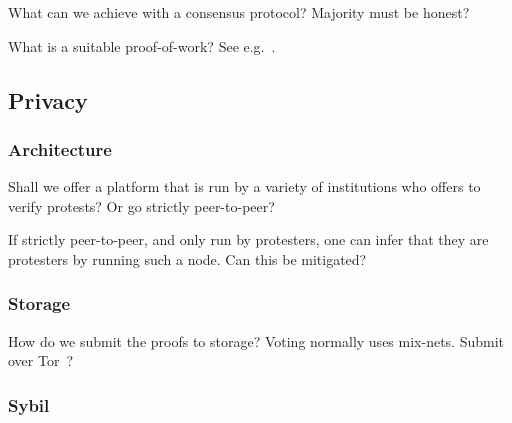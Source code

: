 \begin{frame}
  \begin{question}
    What can we achieve with a consensus protocol?
    Majority must be honest?
  \end{question}
  \begin{question}
    What is a suitable proof-of-work?
    See e.g.~\cite{FairProofOfWork}.
  \end{question}
\end{frame}

\subsection{Privacy}

\subsubsection{Architecture}

\begin{frame}
  \begin{question}
    Shall we offer a platform that is run by a variety of institutions who 
    offers to verify protests?
    Or go strictly peer-to-peer?
  \end{question}
  \begin{question}
    If strictly peer-to-peer, and only run by protesters, one can infer that 
    they are protesters by running such a node.
    Can this be mitigated?
  \end{question}
\end{frame}

\subsubsection{Storage}

\begin{frame}
  \begin{question}
    How do we submit the proofs to storage?
    Voting normally uses mix-nets.
    Submit over Tor~\cite{Tor}?
  \end{question}

\end{frame}

\subsubsection{Sybil}

